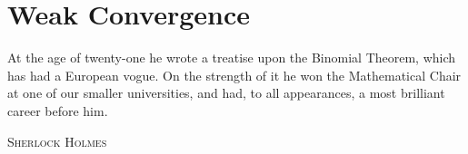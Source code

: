 \chapter{Weak Convergence}

\epigraph{
At the age of twenty-one he wrote a treatise upon the Binomial Theorem, which has had a European vogue. On the strength of it he won the Mathematical Chair at one of our smaller universities, and had, to all appearances, a most brilliant career before him.
}
{\textsc{Sherlock Holmes}} %


